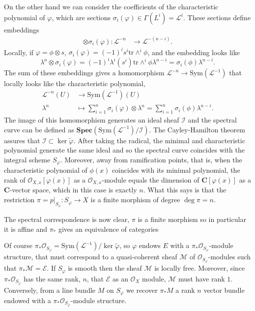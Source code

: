 \documentclass[12pt,a4paper]{book}
\theoremstyle{definition} \newtheorem{defn}[thm]{Definition}
\theoremstyle{definition} \newtheorem{ejemplo}[thm]{Example}
\theoremstyle{remark} \newtheorem{rem}[thm]{Remark}
\def\OO{\mathscr{O}}
\def\LL{\mathscr{L}}
\def\MM{\mathscr{M}}
\def\II{\mathscr{I}}
\def\EE{\mathscr{E}}
\def\CC{\mathbf{C}}
\def\tr{\mathrm{tr}}
\def\Sym{\mathrm{Sym}}
\def\RSpec{\mathbf{Spec}}
\begin{document}
  On the other hand we can consider the coefficients of the characteristic polynomial of $\varphi$, which are sections $\sigma_i(\varphi) \in \Gamma(L^i)=\LL^i$. These sections define embeddings 
  \begin{align*}
    \otimes \sigma_i(\varphi):\LL^{-n}&\longrightarrow \LL^{-(n-i)}.
    \end{align*}
    Locally, if $\varphi=\phi \otimes s$, $\sigma_i(\varphi)=(-1)^i s^i \tr \wedge^i \phi$, and the embedding looks like
\begin{equation*}
  \lambda^n \otimes \sigma_i(\varphi)= (-1)^i \lambda^i(s^i)  \tr \wedge^i\phi \lambda^{n-i} = \sigma_i(\phi) \lambda^{n-i}.
\end{equation*}
The sum of these embeddings gives a homomorphism $\LL^{-n}\rightarrow \Sym(\LL^{-1})$ that locally looks like the characteristic polynomial,
    \begin{align*}
      \LL^{-n}(U)&\longrightarrow \Sym(\LL^{-1})(U)\\ 
      \lambda^n &\longmapsto \sum_{i=1}^n \sigma_i(\varphi) \otimes \lambda^n=\sum_{i=1}^n \sigma_i(\phi) \lambda^{n-i}.
      \end{align*}
      The image of this homomorphism generates an ideal sheaf $\II$ and the spectral curve can be defined as $\RSpec(\Sym(\LL^{-1})/\II)$. The Cayley-Hamilton theorem assures that $\II \subset \ker \tilde{\varphi}$. After taking the radical, the minimal and characteristic polynomial generate the same ideal and so the spectral curve coincides with the integral scheme $S_\varphi$. Moreover, away from ramification points, that is, when the characteristic polynomial of $\phi(x)$ coincides with its minimal polynomial, the rank of $\OO_{X,x}[\varphi(x)]$ as a $\OO_{X,x}$-module equals the dimension of $\CC[\varphi(x)]$ as a $\CC$-vector space, which in this case is exactly $n$. What this says is that the restriction $\pi=p|_{S_\varphi}:S_{\varphi} \rightarrow X$ is a finite morphism of degree $\deg \pi =n$.

      The spectral correspondence is now clear, $\pi$ is a finite morphism so in particular it is affine and $\pi_*$ gives an equivalence of categories
  \begin{center}
  \end{center}
  Of course $\pi_*\OO_{S_\varphi}=\Sym(\LL^{-1})/\ker \tilde{\varphi}$, so $\varphi$ endows $E$ with a $\pi_*\OO_{S_\varphi}$-module structure, that must correspond to a quasi-coherent sheaf $\MM$ of $\OO_{S_\varphi}$-modules such that $\pi_* \MM=\EE$. If $S_\varphi$ is smooth then the sheaf $\MM$ is locally free. Moreover, since  $\pi_*\OO_{S_\varphi}$ has the same rank, $n$, that $\EE$ as an $\OO_X$ module, $\MM$ must have rank $1$. Conversely, from a line bundle $M$ on $S_\varphi$ we recover $\pi_*M$ a rank $n$ vector bundle endowed with a $\pi_*\OO_{S_\varphi}$-module structure. 
\end{document}
